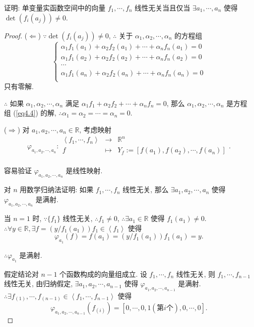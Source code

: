 \documentclass[color=black,device=normal,lang=cn,mode=geye]{elegantnote}
\begin{document}
\begin{exercisec}[1.2.5]
    证明: 单变量实函数空间中的向量 $f_1,\cdots,f_n$ 线性无关当且仅当 $\exists a_1,\cdots,a_n$ 使得 $\det(f_i(a_j))\neq0$.
\end{exercisec}
\begin{proof}  
    ($\Leftarrow$) $\because\det(f_i(a_j))\neq0$, $\therefore$ 关于 $\alpha_1,\alpha_2,\cdots,\alpha_n$ 的方程组
    \begin{equation}\label{eq4.4}
        \begin{cases}
            \alpha_1f_1(a_1)+\alpha_2f_2(a_1)+\cdots+\alpha_nf_n(a_1)=0 \\
            \alpha_1f_1(a_2)+\alpha_2f_2(a_2)+\cdots+\alpha_nf_n(a_2)=0 \\
            \cdots \\
            \alpha_1f_1(a_n)+\alpha_2f_2(a_n)+\cdots+\alpha_nf_n(a_n)=0 \\
        \end{cases}
    \end{equation}
    只有零解.

    $\therefore$ 如果 $\alpha_1,\alpha_2,\cdots,\alpha_n$ 满足 $\alpha_1f_1+\alpha_2f_2+\cdots+\alpha_nf_n=0$, 那么 $\alpha_1,\alpha_2,\cdots,\alpha_n$ 是方程组 (\ref{eq4.4}) 的解, $\therefore\alpha_1=\alpha_2=\cdots=\alpha_n=0$.

    ($\Rightarrow$) 对 $a_1,a_2,\cdots,a_n\in\mathbb{R}$, 考虑映射
    \[\varphi_{a_1,a_2,\cdots,a_n}:\begin{array}{rcl}
        \left<f_1,\cdots,f_n\right> & \to & \mathbb{R}^n \\
        f & \mapsto & Y_f:=[f(a_1),f(a_2),\cdots,f(a_n)] \\
    \end{array}.\]

    容易验证 $\varphi_{a_1,a_2,\cdots,a_n}$ 是线性映射.

    对 $n$ 用数学归纳法证明: 如果 $f_1,\cdots,f_n$ 线性无关, 那么 $\exists a_1,a_2,\cdots,a_n$ 使得 $\varphi_{a_1,a_2,\cdots,a_n}$ 是满射.
    
    当 $n=1$ 时, $\because\{f_1\}$ 线性无关, $\therefore f_1\neq0$, $\therefore\exists a_1\in\mathbb{R}$ 使得 $f_1(a_1)\neq0$. $\therefore\forall y\in\mathbb{R},\exists f=(y/f_1(a_1))f_1\in\left<f_1\right>$ 使得
    \[\varphi_{a_1}(f)=f(a_1)=(y/f_1(a_1))f_1(a_1)=y.\]

    $\therefore\varphi_{a_1}$ 是满射.
    
    假定结论对 $n-1$ 个函数构成的向量组成立. 设 $f_1,\cdots,f_n$ 线性无关, 则 $f_1,\cdots,f_{n-1}$ 线性无关, 由归纳假定, $\exists a_1,a_2,\cdots,a_{n-1}$ 使得 $\varphi_{a_1,a_2,\cdots,a_{n-1}}$ 是满射. $\therefore\exists f_{(1)},\cdots,f_{(n-1)}\in\left<f_1,\cdots,f_{n-1}\right>$ 使得
    \[\varphi_{a_1,a_2,\cdots,a_{n-1}}(f_{(i)})=[0,\cdots,0,1(\text{第}i\text{个}),0,\cdots,0].\]


\end{proof}
\end{document}

